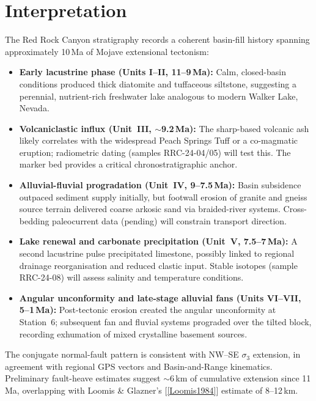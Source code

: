 \section{Interpretation}

The Red Rock Canyon stratigraphy records a coherent basin-fill history spanning
approximately 10\,Ma of Mojave extensional tectonism:

\begin{itemize}
  \item \textbf{Early lacustrine phase (Units I--II, 11--9\,Ma):}
        Calm, closed-basin conditions produced thick diatomite and tuffaceous siltstone,
        suggesting a perennial, nutrient-rich freshwater lake analogous to modern
        Walker Lake, Nevada.
  \item \textbf{Volcaniclastic influx (Unit~III, $\sim$9.2\,Ma):}
        The sharp-based volcanic ash likely correlates with the widespread
        Peach Springs Tuff or a co-magmatic eruption; radiometric dating
        (samples RRC-24-04/05) will test this. The marker bed provides a critical
        chronostratigraphic anchor.
  \item \textbf{Alluvial-fluvial progradation (Unit~IV, 9--7.5\,Ma):}
        Basin subsidence outpaced sediment supply initially, but footwall
        erosion of granite and gneiss source terrain delivered coarse arkosic sand
        via braided-river systems. Cross-bedding paleocurrent data (pending) will
        constrain transport direction.
  \item \textbf{Lake renewal and carbonate precipitation (Unit~V, 7.5--7\,Ma):}
        A second lacustrine pulse precipitated limestone, possibly linked to
        regional drainage reorganisation and reduced clastic input. Stable isotopes
        (sample RRC-24-08) will assess salinity and temperature conditions.
  \item \textbf{Angular unconformity and late-stage alluvial fans (Units VI--VII, 5--1\,Ma):}
        Post-tectonic erosion created the angular unconformity at Station~6;
        subsequent fan and fluvial systems prograded over the tilted block,
        recording exhumation of mixed crystalline basement sources.
\end{itemize}

The conjugate normal-fault pattern is consistent with NW--SE $\sigma_3$ extension,
in agreement with regional GPS vectors and Basin-and-Range kinematics.
Preliminary fault-heave estimates suggest $\sim$6\,km of cumulative extension since 11\,Ma,
overlapping with Loomis \& Glazner's [\ref{Loomis1984}] estimate of 8--12\,km.

